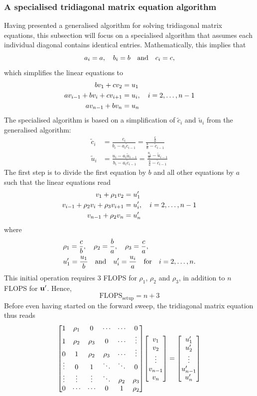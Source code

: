 \documentclass[reprint,english]{revtex4-1}
\begin{document}
\subsubsection{A specialised tridiagonal matrix equation algorithm}\label{sec:special_tridiagonal_algorithm}
Having presented a generalised algorithm for solving tridiagonal matrix equations, this subsection will focus on a specialised algorithm that assumes each individual diagonal contains identical entries. Mathematically, this implies that
\[a_i=a\qc b_i=b\qand c_i=c,\]
which simplifies the linear equations to
\begin{align*}
bv_1+cv_2&=u_1\\
av_{i-1}+bv_i+cv_{i+1}&=u_i\qc i=2,\ldots,n-1\\
av_{n-1}+bv_n&=u_n
\end{align*}
The specialised algorithm is based on a simplification of \(\tilde{c}_i\) and \(\tilde{u}_i\) from the generalised algorithm:
\begin{align*}
\tilde{c}_i&=\frac{c_i}{b_i-a_i\tilde{c}_{i-1}}=\frac{\frac{c}{a}}{\frac{b}{a}-\tilde{c}_{i-1}}\\
\tilde{u}_i&=\frac{u_i-a_i\tilde{u}_{i-1}}{b_i-a_i\tilde{c}_{i-1}}=\frac{\frac{u_i}{a}-\tilde{u}_{i-1}}{\frac{b}{a}-\tilde{c}_{i-1}}
\end{align*}
The first step is to divide the first equation by \(b\) and all other equations by \(a\) such that the linear equations read
\begin{align*}
v_1+\rho_1v_2&=u'_1\\
v_{i-1}+\rho_2v_i+\rho_3v_{i+1}&=u'_i\qc i=2,\ldots,n-1\\
v_{n-1}+\rho_2v_n&=u'_n
\end{align*}
where
\begin{align*}
&\rho_1=\frac{c}{b}\qc\rho_2=\frac{b}{a}\qc\rho_3=\frac{c}{a},\\
&u'_1=\frac{u_1}{b}\qand u'_i=\frac{u_i}{a}\qq{for}i=2,\ldots,n.
\end{align*}
This initial operation requires 3 FLOPS for \(\rho_1\), \(\rho_2\) and \(\rho_3\), in addition to \(n\) FLOPS for \(\vb{u}'\). Hence,
\begin{equation}
\text{FLOPS}_{\text{setup}}=n+3
\end{equation}
Before even having started on the forward sweep, the tridiagonal matrix equation thus reads
\[\mqty[1 & \rho_1 & 0 & \cdots & \cdots & 0 \\
1 & \rho_2 & \rho_3 & 0 & \cdots & \vdots \\
0 & 1 & \rho_2 & \rho_3 & \cdots & \vdots \\
\vdots & 0 & 1 & \ddots & \ddots & 0 \\
\vdots & \vdots & \vdots & \ddots & \rho_2 & \rho_3 \\
0 & \cdots & \cdots & 0 & 1 & \rho_2]\mqty[v_1 \\ v_2 \\ \vdots \\ v_{n-1} \\ v_n]=\mqty[u'_1 \\ u'_2 \\ \vdots \\ u'_{n-1} \\ u'_n]\]
\end{document}

